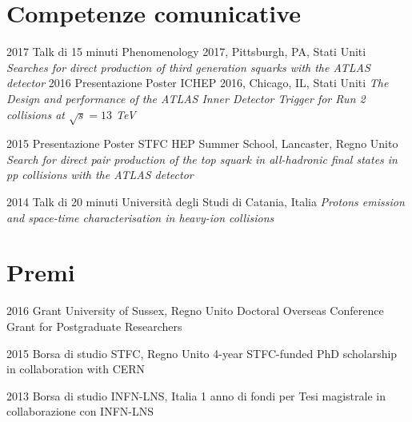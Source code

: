 \documentclass[print]{cv} %
\begin{document}
\section{Competenze comunicative}

\begin{entrylist}

  \entry
    {2017}
    {Talk di 15 minuti}
    {Phenomenology 2017, Pittsburgh, PA, Stati Uniti}
    {\emph{Searches for direct production of third generation squarks with the ATLAS detector}}
  \entry
    {2016}
    {Presentazione Poster}
    {ICHEP 2016, Chicago, IL, Stati Uniti}
    {\emph{The Design and performance of the ATLAS Inner Detector Trigger for Run 2 collisions at $\sqrt{s} = 13$ TeV}}

  \entry
    {2015}
    {Presentazione Poster}
    {STFC HEP Summer School, Lancaster, Regno Unito}
    {\emph{Search for direct pair production of the top squark in all-hadronic final states in \emph{pp} collisions with the ATLAS detector}}

  \entry
    {2014}
    {Talk di 20 minuti}
    {Università degli Studi di Catania, Italia}
    {\emph{Protons emission and space-time characterisation in heavy-ion collisions}}
\end{entrylist}

\section{Premi}

\begin{entrylist}
  \entry
      {2016}
      {Grant}
      {University of Sussex, Regno Unito}
      {Doctoral Overseas Conference Grant for Postgraduate Researchers}

  \entry
      {2015}
      {Borsa di studio}
      {STFC, Regno Unito}
      {4-year STFC-funded PhD scholarship in collaboration with CERN}

  \entry
      {2013}
      {Borsa di studio}
      {INFN-LNS, Italia}
      {1 anno di fondi per Tesi magistrale in collaborazione con INFN-LNS}
\end{entrylist}
\end{document}
